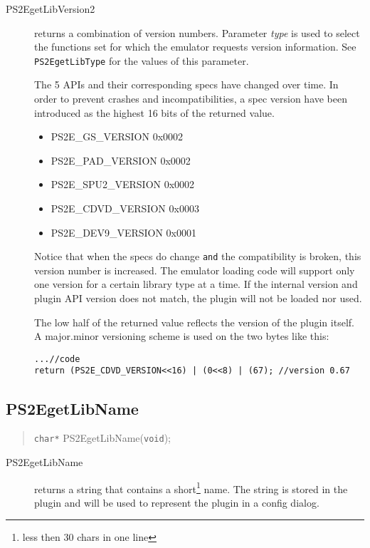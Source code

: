 \documentclass[10pt]{article}
\begin{document}
\begin{description}
\item[PS2EgetLibVersion2] returns a combination of version numbers.
Parameter \emph{type} is used to select the functions set for which
 the emulator requests version information. See \texttt{PS2EgetLibType}
 for the values of this parameter.

The 5 APIs and their corresponding specs have changed over time.
 In order to prevent crashes and incompatibilities, a spec version have
 been introduced as the highest 16 bits of the returned value.
\begin{itemize}
\item PS2E\_GS\_VERSION   0x0002
\item PS2E\_PAD\_VERSION  0x0002
\item PS2E\_SPU2\_VERSION 0x0002
\item PS2E\_CDVD\_VERSION 0x0003
\item PS2E\_DEV9\_VERSION 0x0001
\end{itemize}
Notice that when the specs do change \texttt{and} the compatibility is broken,
 this version number is increased. The emulator loading code will support
 only one version for a certain library type at a time. If the internal
 version and plugin API version does not match, the plugin
 will not be loaded nor used.

The low half of the returned value reflects the version of the plugin itself.
 A major.minor versioning scheme is used on the two bytes like this:
\begin{verbatim}
...//code
return (PS2E_CDVD_VERSION<<16) | (0<<8) | (67);	//version 0.67
\end{verbatim}
\end{description}



\subsection{PS2EgetLibName}
\begin{quote}\texttt{char*} PS2EgetLibName(\texttt{void});\end{quote}

\begin{description}
\item[PS2EgetLibName] returns a string that contains a short\footnote{
less then 30 chars in one line} name. The string is stored
 in the plugin and will be used to represent the plugin in a config dialog.
\end{description}
\end{document}
